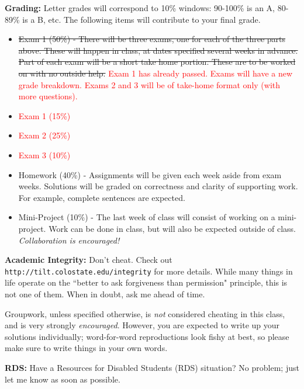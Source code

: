 \documentclass[12pt]{amsbook}
\begin{document}
\textbf{Grading:} Letter grades will correspond to 10\% windows: 90-100\% is an A, 80-89\% is a B, etc. The following items will contribute to your final grade.
\begin{itemize}
\item \sout{ Exam 1 (50\%) - There will be three exams, one for each of the three parts above. These will happen in class, at dates specified several weeks in advance. Part of each exam will be a short take home portion. These are to be worked on with no outside help.} \textcolor{red}{Exam 1 has already passed. Exams will have a new grade breakdown.  Exams 2 and 3 will be of take-home format only (with more questions).}
\item \textcolor{red}{Exam 1 (15\%)}
\item \textcolor{red}{Exam 2 (25\%)}
\item \textcolor{red}{Exam 3 (10\%)}
\item Homework (40\%) - Assignments will be given each week aside from exam weeks. Solutions will be graded on correctness and clarity of supporting work. For example, complete sentences are expected. 
\item Mini-Project (10\%) - The last week of class will consist of working on a mini-project.  Work can be done in class, but will also be expected outside of class. \emph{Collaboration is encouraged!}
\end{itemize}

\textbf{Academic Integrity:} Don't cheat. Check out \texttt{http://tilt.colostate.edu/integrity} for more details. While many things in life operate on the ``better to ask forgiveness than permission" principle, this is not one of them. When in doubt, ask me ahead of time.

Groupwork, unless specified otherwise, is \emph{not} considered cheating in this class, and is very strongly \emph{encouraged}. However, you are expected to write up your solutions individually; word-for-word reproductions look fishy at best, so please make sure to write things in your own words.

\textbf{RDS:} Have a Resources for Disabled Students (RDS) situation? No problem; just let me know as soon as possible.
\end{document}
